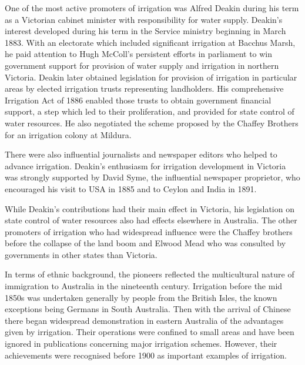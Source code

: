 One of the most active promoters of irrigation was Alfred Deakin
  during his term as a Victorian cabinet minister
with responsibility for water supply.  Deakin's interest developed
during his term in the Service ministry beginning in March 1883.  With
an electorate which included significant irrigation at Bacchus Marsh,
he paid attention to Hugh McColl's  persistent
efforts in parliament to win government support for provision of water
supply and irrigation in northern Victoria.  Deakin later obtained
legislation for provision of irrigation in particular areas by elected
irrigation trusts representing landholders.  His comprehensive
Irrigation Act of 1886 
enabled those trusts to obtain government financial
support, a step which led to their proliferation, and provided for
state control of water resources.  He also negotiated the scheme
proposed by the Chaffey Brothers  for an
irrigation colony at Mildura.

There were also influential journalists and newspaper editors who
helped to advance irrigation. Deakin's enthusiasm for irrigation
development in Victoria was strongly supported by David Syme,
 the influential newspaper proprietor, who encouraged
his visit to USA in 1885 and to Ceylon and
India in 1891.

While Deakin's contributions had their main effect in Victoria, his
legislation on state control of water resources also had effects
elsewhere in Australia.  The other promoters of irrigation who had
widespread influence were the Chaffey brothers before the collapse of
the land boom and Elwood Mead  who was consulted by
governments in other states than Victoria.

In terms of ethnic background, the pioneers reflected the
multicultural nature of immigration to Australia in the nineteenth
century. Irrigation before the mid 1850s was undertaken generally by
people from the British Isles, the known exceptions
being Germans  in South Australia.  Then with the
arrival of Chinese  there began widespread
demonstration in eastern Australia of the advantages given by
irrigation.  Their operations were confined to small areas and have
been ignored in publications concerning major irrigation
schemes. However, their achievements were recognised before 1900 as
important examples of irrigation.

